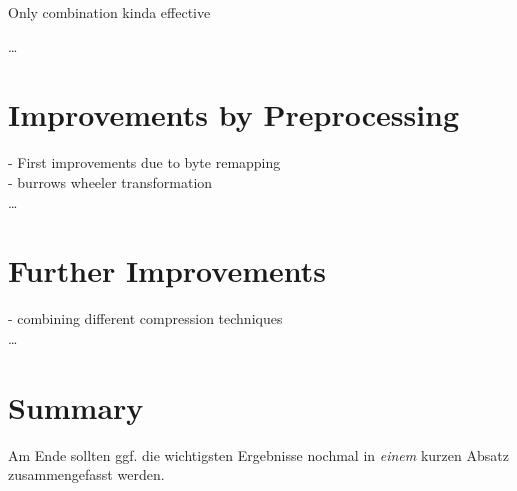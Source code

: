 \par{
Only combination kinda effective
}


\ldots

\section{Improvements by Preprocessing}
\label{ch:Analysis:sec:Improvements by Preprocessing}
- First improvements due to byte remapping\\
- burrows wheeler transformation\\
\ldots

\section{Further Improvements}
\label{ch:Analysis:sec:Further Improvements}
- combining different compression techniques\\
\ldots


\section{Summary}
\label{ch:Analyse:sec:Summary}

Am Ende sollten ggf. die wichtigsten Ergebnisse nochmal in \emph{einem}
kurzen Absatz zusammengefasst werden.

